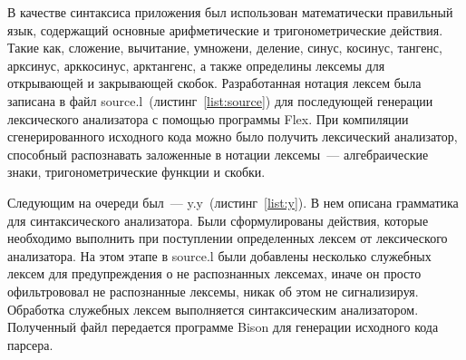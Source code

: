 В качестве синтаксиса приложения был использован математически
правильный язык, содержащий основные арифметические и
тригонометрические действия.  Такие как, сложение, вычитание,
умножени, деление, синус, косинус, тангенс, арксинус, арккосинус,
арктангенс, а также определины лексемы для открывающей и закрывающей
скобок.  Разработанная нотация лексем была записана в файл
source.l~(листинг~\ref{list:source}) для последующей генерации
лексического анализатора с помощью программы Flex.  При компиляции
сгенерированного исходного кода можно было получить лексический
анализатор, способный распознавать заложенные в нотации лексемы~---
алгебраические знаки, тригонометрические функции и скобки.

Следующим на очереди был~--- y.y~(листинг~\ref{list:y}).  В нем
описана грамматика для синтаксического анализатора.  Были
сформулированы действия, которые необходимо выполнить при поступлении
определенных лексем от лексического анализатора.  На этом этапе в
source.l были добавлены несколько служебных лексем для предупреждения
о не распознанных лексемах, иначе он просто офильтрововал не
распознанные лексемы, никак об этом не сигнализируя.  Обработка
служебных лексем выполняется синтаксическим анализатором.  Полученный
файл передается программе Bison для генерации исходного кода парсера.

